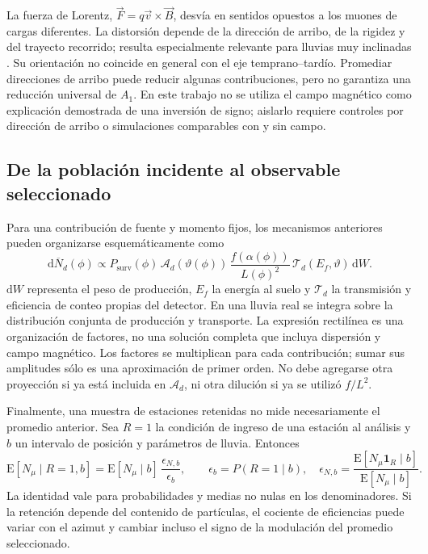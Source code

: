 La fuerza de Lorentz, $\vec F=q\vec v\times\vec B$, desvía en sentidos opuestos a los muones de cargas diferentes. La distorsión depende de la dirección de arribo, de la rigidez y del trayecto recorrido; resulta especialmente relevante para lluvias muy inclinadas \cite{GAP2007_124,collaboration_2014}. Su orientación no coincide en general con el eje temprano--tardío. Promediar direcciones de arribo puede reducir algunas contribuciones, pero no garantiza una reducción universal de $A_1$. En este trabajo no se utiliza el campo magnético como explicación demostrada de una inversión de signo; aislarlo requiere controles por dirección de arribo o simulaciones comparables con y sin campo.

\subsection{De la población incidente al observable seleccionado}
\label{subsec:respuesta_seleccion}

Para una contribución de fuente y momento fijos, los mecanismos anteriores pueden organizarse esquemáticamente como
\begin{equation}
\mathrm{d}\overline N_d(\phi)\propto
P_{\mathrm{surv}}(\phi)\,
\mathcal A_d(\vartheta(\phi))\,
\frac{f(\alpha(\phi))}{L(\phi)^2}\,
\mathcal T_d(E_f,\vartheta)\,\mathrm{d}W.
\label{eq:marco_muonico}
\end{equation}
$\mathrm{d}W$ representa el peso de producción, $E_f$ la energía al suelo y $\mathcal T_d$ la transmisión y eficiencia de conteo propias del detector. En una lluvia real se integra sobre la distribución conjunta de producción y transporte. La expresión rectilínea es una organización de factores, no una solución completa que incluya dispersión y campo magnético. Los factores se multiplican para cada contribución; sumar sus amplitudes sólo es una aproximación de primer orden. No debe agregarse otra proyección si ya está incluida en $\mathcal A_d$, ni otra dilución si ya se utilizó $f/L^2$.

Finalmente, una muestra de estaciones retenidas no mide necesariamente el promedio anterior. Sea $R=1$ la condición de ingreso de una estación al análisis y $b$ un intervalo de posición y parámetros de lluvia. Entonces
\begin{equation}
\mathrm{E}[N_\mu\mid R=1,b]
=\mathrm{E}[N_\mu\mid b]\,
\frac{\epsilon_{N,b}}{\epsilon_b},\qquad
\epsilon_b=P(R=1\mid b),\quad
\epsilon_{N,b}=\frac{\mathrm{E}[N_\mu\mathbf 1_R\mid b]}{\mathrm{E}[N_\mu\mid b]}.
\label{eq:conteo_condicionado}
\end{equation}
La identidad vale para probabilidades y medias no nulas en los denominadores. Si la retención depende del contenido de partículas, el cociente de eficiencias puede variar con el azimut y cambiar incluso el signo de la modulación del promedio seleccionado.

